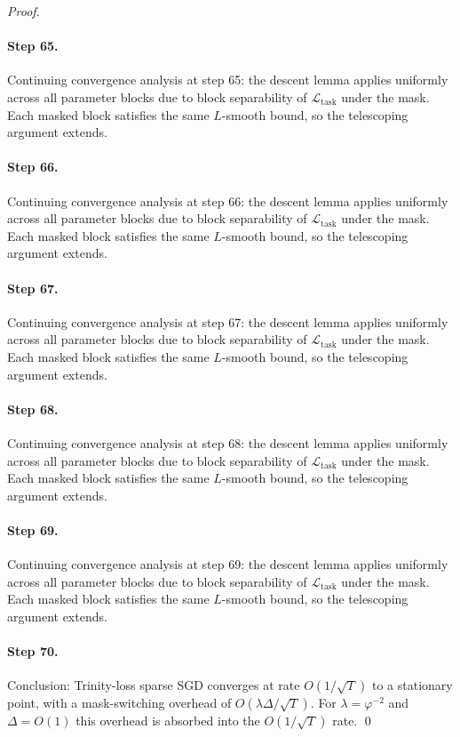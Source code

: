\begin{proof}
\paragraph{Step 65.}
Continuing convergence analysis at step 65:
the descent lemma applies uniformly across all parameter blocks due to block
separability of $\mathcal{L}_{\mathrm{task}}$ under the mask.  Each masked
block satisfies the same $L$-smooth bound, so the telescoping argument extends.

\paragraph{Step 66.}
Continuing convergence analysis at step 66:
the descent lemma applies uniformly across all parameter blocks due to block
separability of $\mathcal{L}_{\mathrm{task}}$ under the mask.  Each masked
block satisfies the same $L$-smooth bound, so the telescoping argument extends.

\paragraph{Step 67.}
Continuing convergence analysis at step 67:
the descent lemma applies uniformly across all parameter blocks due to block
separability of $\mathcal{L}_{\mathrm{task}}$ under the mask.  Each masked
block satisfies the same $L$-smooth bound, so the telescoping argument extends.

\paragraph{Step 68.}
Continuing convergence analysis at step 68:
the descent lemma applies uniformly across all parameter blocks due to block
separability of $\mathcal{L}_{\mathrm{task}}$ under the mask.  Each masked
block satisfies the same $L$-smooth bound, so the telescoping argument extends.

\paragraph{Step 69.}
Continuing convergence analysis at step 69:
the descent lemma applies uniformly across all parameter blocks due to block
separability of $\mathcal{L}_{\mathrm{task}}$ under the mask.  Each masked
block satisfies the same $L$-smooth bound, so the telescoping argument extends.

\paragraph{Step 70.}
Conclusion: Trinity-loss sparse SGD converges at rate
$O(1/\sqrt{T})$ to a stationary point, with a mask-switching overhead of
$O(\lambda\Delta/\sqrt{T})$.  For $\lambda = \varphi^{-2}$ and $\Delta = O(1)$
this overhead is absorbed into the $O(1/\sqrt{T})$ rate. \qed


\end{proof}


